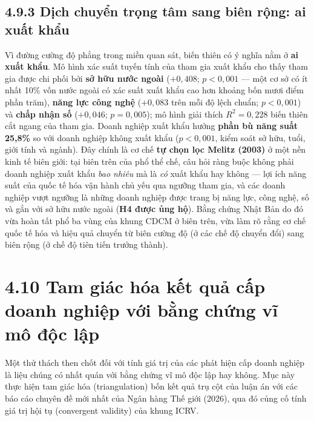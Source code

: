 \documentclass[
  a4paper,
  13pt]{extreport}
\begin{document}
\hypertarget{dux1ecbch-chuyux1ec3n-trux1ecdng-tuxe2m-sang-biuxean-rux1ed9ng-ai-xuux1ea5t-khux1ea9u}{%
\subsection{4.9.3 Dịch chuyển trọng tâm sang biên rộng: ai xuất
khẩu}\label{dux1ecbch-chuyux1ec3n-trux1ecdng-tuxe2m-sang-biuxean-rux1ed9ng-ai-xuux1ea5t-khux1ea9u}}

Vì đường cường độ phẳng trong miền quan sát, biến thiên có ý nghĩa nằm ở
\textbf{ai xuất khẩu}. Mô hình xác suất tuyến tính của tham gia xuất
khẩu cho thấy tham gia được chi phối bởi \textbf{sở hữu nước ngoài}
(\(+0{,}408\); \(p < 0{,}001\) --- một cơ sở có ít nhất 10\% vốn nước
ngoài có xác suất xuất khẩu cao hơn khoảng bốn mươi điểm phần trăm),
\textbf{năng lực công nghệ} (\(+0{,}083\) trên mỗi độ lệch chuẩn;
\(p < 0{,}001\)) và \textbf{chấp nhận số} (\(+0{,}046\);
\(p = 0{,}005\)); mô hình giải thích \(R^2 = 0{,}228\) biến thiên cắt
ngang của tham gia. Doanh nghiệp xuất khẩu hưởng \textbf{phần bù năng
suất 25,8\%} so với doanh nghiệp không xuất khẩu (\(p < 0{,}001\), kiểm
soát sở hữu, tuổi, giới tính và ngành). Đây chính là cơ chế \textbf{tự
chọn lọc Melitz (2003)} ở một nền kinh tế biên giới: tại biên trên của
phổ thể chế, câu hỏi ràng buộc không phải doanh nghiệp xuất khẩu
\emph{bao nhiêu} mà là \emph{có} xuất khẩu hay không --- lợi ích năng
suất của quốc tế hóa vận hành chủ yếu qua ngưỡng tham gia, và các doanh
nghiệp vượt ngưỡng là những doanh nghiệp được trang bị năng lực, công
nghệ, số và gắn với sở hữu nước ngoài (\textbf{H4 được ủng hộ}). Bằng
chứng Nhật Bản do đó vừa hoàn tất phổ ba vùng của khung CDCM ở biên
trên, vừa làm rõ rằng cơ chế quốc tế hóa và hiệu quả chuyển từ biên
cường độ (ở các chế độ chuyển đổi) sang biên rộng (ở chế độ tiên tiến
trưởng thành).

\hypertarget{tam-giuxe1c-huxf3a-kux1ebft-quux1ea3-cux1ea5p-doanh-nghiux1ec7p-vux1edbi-bux1eb1ng-chux1ee9ng-vux129-muxf4-ux111ux1ed9c-lux1eadp}{%
\section{4.10 Tam giác hóa kết quả cấp doanh nghiệp với bằng chứng vĩ mô
độc
lập}\label{tam-giuxe1c-huxf3a-kux1ebft-quux1ea3-cux1ea5p-doanh-nghiux1ec7p-vux1edbi-bux1eb1ng-chux1ee9ng-vux129-muxf4-ux111ux1ed9c-lux1eadp}}

Một thử thách then chốt đối với tính giá trị của các phát hiện cấp doanh
nghiệp là liệu chúng có nhất quán với bằng chứng vĩ mô độc lập hay
không. Mục này thực hiện tam giác hóa (triangulation) bốn kết quả trụ
cột của luận án với các báo cáo chuyên đề mới nhất của Ngân hàng Thế
giới (2026), qua đó củng cố tính giá trị hội tụ (convergent validity)
của khung ICRV.
\end{document}
